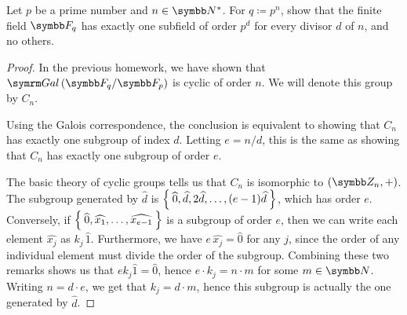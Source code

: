 \begin{exercise}
Let \(p\) be a prime number and \(n \in \naturals^*\). For \(q \coloneq p^n\), show that the finite field \(\finitefield{q}\) has exactly one subfield of order \(p^d\) for every divisor \(d\) of \(n\), and no others.
\end{exercise}
\begin{proof}
In the previous homework, we have shown that \(\Gal{\finitefield{q}}{\finitefield{p}}\) is cyclic of order \(n\). We will denote this group by \(C_n\).

Using the Galois correspondence, the conclusion is equivalent to showing that \(C_n\) has exactly one subgroup of index \(d\). Letting \(e = n / d\), this is the same as showing that \(C_n\) has exactly one subgroup of order \(e\).

The basic theory of cyclic groups tells us that \(C_n\) is isomorphic to \(\left(\integersmod{n}, +\right)\). The subgroup generated by \(\widehat{d}\) is \(\Set{ \widehat{0}, \widehat{d}, 2 \widehat{d}, \dots, (e-1) \widehat{d} }\), which has order \(e\). Conversely, if \(\Set{ \widehat{0}, \widehat{x_1}, \dots, \widehat{x_{e - 1}} }\) is a subgroup of order \(e\), then we can write each element \(\widehat{x_j}\) as \(k_j \, \widehat{1}\). Furthermore, we have \(e \, \widehat{x_j} = \widehat{0}\) for any \(j\), since the order of any individual element must divide the order of the subgroup. Combining these two remarks shows us that \(e k_j \widehat{1} = \widehat{0}\), hence \(e \cdot k_j = n \cdot m\) for some \(m \in \naturals\). Writing \(n = d \cdot e\), we get that \(k_j = d \cdot m\), hence this subgroup is actually the one generated by \(\widehat{d}\).
\end{proof}
